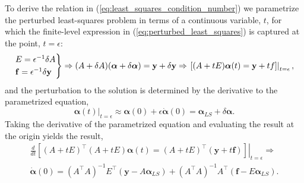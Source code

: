 \documentclass[12pt, twoside, draft]{article}
\begin{document}
To derive the relation in (\ref{eq:least_squares_condition_number}) we parametrize the perturbed least-squares problem in terms of a continuous variable, $t$, for which the finite-level expression in (\ref{eq:perturbed_least_squares}) is captured at the point, $t=\epsilon$:
\begin{equation}
\begin{rcases}
E = \epsilon^{-1} \delta A \\
\mathbf{f} = \epsilon^{-1} \delta \mathbf{y}
\end{rcases} \Rightarrow
(A + \delta A) (\boldsymbol{\alpha} + \delta \boldsymbol{\alpha}) = \mathbf{y} + \delta \mathbf{y} \Rightarrow
\left. [(A + t E) \boldsymbol{\alpha}(t) = \mathbf{y} + tf] \right|_{t=\epsilon},
\end{equation}
and the perturbation to the solution is determined by the derivative to the parametrized equation,
\begin{equation}
\boldsymbol{\alpha} (t)|_{t=\epsilon} \approx \boldsymbol{\alpha}(0) + \epsilon \dot{\boldsymbol{\alpha}} (0) = \boldsymbol{\alpha}_{LS} + \delta \boldsymbol{\alpha}.
\end{equation}
Taking the derivative of the parametrized equation and evaluating the result at the origin yields the result,
\begin{multline}
\left. \frac{d}{dt} [(A + tE)^\top (A + tE) \boldsymbol{\alpha}(t) = (A + tE)^\top (\mathbf{y} + t\mathbf{f})]\right|_{t=\epsilon} \Rightarrow \\
\dot{\boldsymbol{\alpha}}(0) = (A^\top A)^{-1} E^\top (\mathbf{y} - A \boldsymbol{\alpha}_{LS}) + (A^\top A)^{-1} A^\top (\mathbf{f } -  E \boldsymbol{\alpha}_{LS}).
\end{multline}
\end{document}
